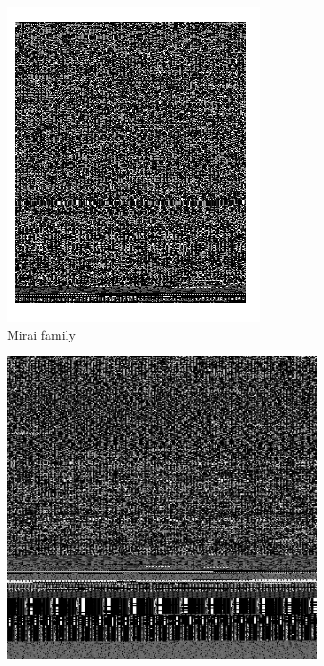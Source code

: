\documentclass[conference, 11pt]{IEEEtran}
\begin{document}
    \begin{figure}[htbp]
        \begin{subfigure}{0.31\textwidth}
            \centerline{\includegraphics[width=\linewidth]{figures/mirai-malware.png}}
            \caption{Mirai family}
            \label{fig2a}
        \end{subfigure}%
        \hspace*{\fill}
        \begin{subfigure}{0.31\textwidth}
            \centerline{\includegraphics[width=\linewidth]{figures/gafgyt-malware.png}}

\end{subfigure}
\end{figure}
\end{document}
